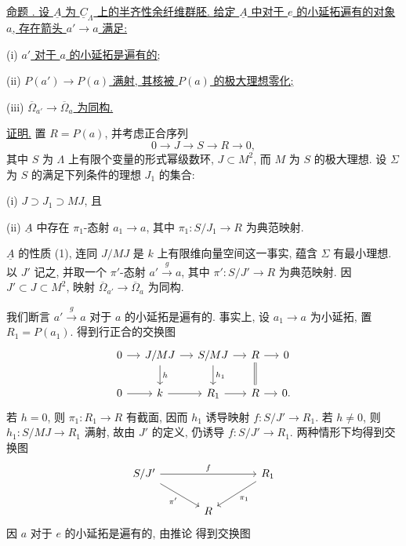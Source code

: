 \underline{命题 .
设 $\underline A$ 为 $\underline C_\Lambda$ 上的半齐性余纤维群胚.
给定 $\underline A$ 中对于 $e$ 的小延拓遍有的对象 $a$,
存在箭头 $a'\longrightarrow a$ 满足:}


(i) \underline{$a'$ 对于 $a$ 的小延拓是遍有的;}

(ii) \underline{$P(a')\longrightarrow P(a)$ 满射,
其核被 $P(a)$ 的极大理想零化;}

(iii) \underline{$\overline\Omega_{a'}\longrightarrow\overline\Omega_a$ 为同构.}

\underline{证明.} 置 $R=P(a)$, 并考虑正合序列
\[
 0\longrightarrow J\longrightarrow S\longrightarrow R
 \longrightarrow0,
\]
其中 $S$ 为 $\Lambda$ 上有限个变量的形式幂级数环,
$J\subset M^2$, 而 $M$ 为 $S$ 的极大理想.
设 $\Sigma$ 为 $S$ 的满足下列条件的理想 $J_1$ 的集合:

(i) $J\supset J_1\supset MJ$, 且

(ii) $\underline A$ 中存在 $\pi_1$-态射 $a_1\longrightarrow a$,
其中 $\pi_1:S/J_1\longrightarrow R$ 为典范映射.

$\underline A$ 的性质 (1),
连同 $J/MJ$ 是 $k$ 上有限维向量空间这一事实, 蕴含 $\Sigma$ 有最小理想.
以 $J'$ 记之, 并取一个 $\pi'$-态射 $a'\xrightarrow g a$,
其中 $\pi':S/J'\longrightarrow R$ 为典范映射.
因 $J'\subset J\subset M^2$, 映射
$\overline\Omega_{a'}\longrightarrow\overline\Omega_a$ 为同构.

我们断言 $a'\xrightarrow g a$ 对于 $a$ 的小延拓是遍有的.
事实上, 设 $a_1\longrightarrow a$ 为小延拓, 置 $R_1=P(a_1)$.
得到行正合的交换图
\[
\begin{tikzcd}[column sep=small]
0 \arrow[r] & J/MJ \arrow[r] \arrow[d,"h"]
 & S/MJ \arrow[r] \arrow[d,"h_1"]
 & R \arrow[r] \arrow[d,equal] & 0 \\
0 \arrow[r] & k \arrow[r] & R_1 \arrow[r] & R \arrow[r] & 0.
\end{tikzcd}
\]
若 $h=0$, 则 $\pi_1:R_1\longrightarrow R$ 有截面,
因而 $h_1$ 诱导映射 $f:S/J'\longrightarrow R_1$.
若 $h\ne0$, 则 $h_1:S/MJ\longrightarrow R_1$ 满射,
故由 $J'$ 的定义, 仍诱导 $f:S/J'\longrightarrow R_1$.
两种情形下均得到交换图
\[
\begin{tikzcd}[column sep=large]
S/J' \arrow[rr,"f"] \arrow[dr,"\pi'"']
 & & R_1 \arrow[dl,"\pi_1"] \\
& R &
\end{tikzcd}
\]
因 $a$ 对于 $e$ 的小延拓是遍有的, 由推论 
得到交换图

